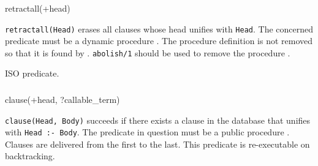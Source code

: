\subsubsection{}

\begin{TemplatesOneCol}
retractall(+head)

\end{TemplatesOneCol}

\Description

\texttt{retractall(Head)} erases all clauses whose head unifies with
\texttt{Head}. The concerned predicate must be a dynamic procedure
. The procedure definition
is not removed so that it is found by 
. \texttt{abolish/1} should be used to remove the
procedure .

\begin{PlErrors}




\end{PlErrors}

\Portability

ISO predicate.

\subsubsection{}

\begin{TemplatesOneCol}
clause(+head, ?callable\_term)

\end{TemplatesOneCol}

\Description

\texttt{clause(Head, Body)} succeeds if there exists a clause in the
database that unifies with \texttt{Head :- Body}. The predicate in question
must be a public procedure . Clauses are delivered from the first to the last. This
predicate is re-executable on backtracking.

\begin{PlErrors}





\end{PlErrors}

